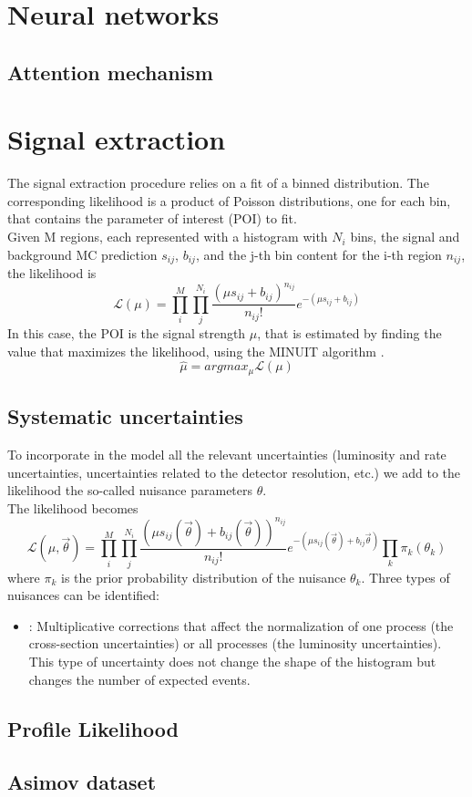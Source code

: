 \label{sec:STAT}
\minitoc
\section{Neural networks}
\subsection{Attention mechanism}

\section{Signal extraction}
The signal extraction procedure relies on a fit of a binned distribution.
The corresponding likelihood is a product of Poisson distributions, one for each bin, that contains the parameter of interest (POI) to fit.\\
Given M regions, each represented with a histogram with $N_i$ bins, the signal and background MC prediction $s_{ij}$, $b_{ij}$, and the j-th bin content for the i-th region $n_{ij}$, the likelihood is 
\begin{equation}
    \mathcal{L}(\mu)=\prod_i^M \prod_j^{N_i} \frac{(\mu s_{ij}+b_{ij})^{n_{ij}}}{n_{ij}!} e^{-(\mu s_{ij}+b_{ij})}
\end{equation}
In this case, the POI is the signal strength $\mu$, that is estimated by finding the value that maximizes the likelihood, using the MINUIT algorithm \ADDREF.
\begin{equation*}
    \hat{\mu}=argmax_\mu \mathcal{L}(\mu)
\end{equation*}

\subsection{Systematic uncertainties}
To incorporate in the model all the relevant uncertainties (\ie luminosity and rate uncertainties, uncertainties related to the detector resolution, etc.) we add to the likelihood the so-called nuisance parameters $\theta$.\\
The likelihood becomes
\begin{equation}
    \mathcal{L}(\mu,\vec{\theta})=\prod_i^M \prod_j^{N_i} \frac{(\mu s_{ij}(\vec{\theta})+b_{ij}(\vec{\theta}))^{n_{ij}}}{n_{ij}!} e^{-(\mu s_{ij}(\vec{\theta})+b_{ij}\vec{\theta})} \prod_k  \pi_{k}(\theta_k)
\end{equation}
where $\pi_{k}$ is the prior probability distribution of the nuisance $\theta_k$.
Three types of nuisances can be identified:
\begin{itemize}
    \item {}: Multiplicative corrections that affect the normalization of one process (\eg the cross-section uncertainties) or all processes (\eg the luminosity uncertainties).\\
    This type of uncertainty does not change the shape of the histogram but changes the number of expected events.
\end{itemize}

\subsection{Profile Likelihood}

\subsection{Asimov dataset}

